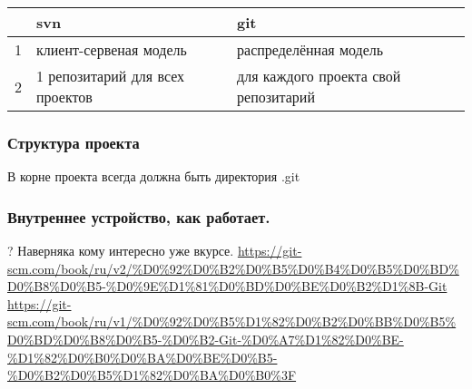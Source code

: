 \documentclass[bigger]{beamer}
\begin{document}
\begin{center}
\begin{tabular}{rll}
    &  svn                              &  git                                   \\
\hline
 1  &  клиент-сервеная модель           &  распределённая модель                 \\
 2  &  1 репозитарий для всех проектов  &  для каждого проекта свой репозитарий  \\
\end{tabular}
\end{center}
\begin{frame}
\frametitle{Структура проекта}
\label{sec-1-1}

В корне проекта всегда должна быть директория .git
\end{frame}
\begin{frame}
\frametitle{Внутреннее устройство, как работает.}
\label{sec-1-2}

? Наверняка кому интересно уже вкурсе.
\href{https://git-scm.com/book/ru/v2/%D0%92%D0%B2%D0%B5%D0%B4%D0%B5%D0%BD%D0%B8%D0%B5-%D0%9E%D1%81%D0%BD%D0%BE%D0%B2%D1%8B-Git}{https://git-scm.com/book/ru/v2/\%D0\%92\%D0\%B2\%D0\%B5\%D0\%B4\%D0\%B5\%D0\%BD\%D0\%B8\%D0\%B5-\%D0\%9E\%D1\%81\%D0\%BD\%D0\%BE\%D0\%B2\%D1\%8B-Git}
\href{https://git-scm.com/book/ru/v1/%D0%92%D0%B5%D1%82%D0%B2%D0%BB%D0%B5%D0%BD%D0%B8%D0%B5-%D0%B2-Git-%D0%A7%D1%82%D0%BE-%D1%82%D0%B0%D0%BA%D0%BE%D0%B5-%D0%B2%D0%B5%D1%82%D0%BA%D0%B0%3F}{https://git-scm.com/book/ru/v1/\%D0\%92\%D0\%B5\%D1\%82\%D0\%B2\%D0\%BB\%D0\%B5\%D0\%BD\%D0\%B8\%D0\%B5-\%D0\%B2-Git-\%D0\%A7\%D1\%82\%D0\%BE-\%D1\%82\%D0\%B0\%D0\%BA\%D0\%BE\%D0\%B5-\%D0\%B2\%D0\%B5\%D1\%82\%D0\%BA\%D0\%B0\%3F}
\end{frame}
\end{document}
